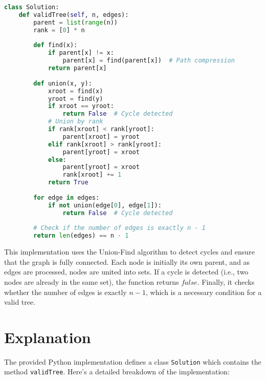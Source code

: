 \begin{fullwidth}
\begin{lstlisting}[language=Python]
class Solution:
    def validTree(self, n, edges):
        parent = list(range(n))
        rank = [0] * n
        
        def find(x):
            if parent[x] != x:
                parent[x] = find(parent[x])  # Path compression
            return parent[x]
        
        def union(x, y):
            xroot = find(x)
            yroot = find(y)
            if xroot == yroot:
                return False  # Cycle detected
            # Union by rank
            if rank[xroot] < rank[yroot]:
                parent[xroot] = yroot
            elif rank[xroot] > rank[yroot]:
                parent[yroot] = xroot
            else:
                parent[yroot] = xroot
                rank[xroot] += 1
            return True
        
        for edge in edges:
            if not union(edge[0], edge[1]):
                return False  # Cycle detected
        
        # Check if the number of edges is exactly n - 1
        return len(edges) == n - 1
\end{lstlisting}
\end{fullwidth}

This implementation uses the Union-Find algorithm to detect cycles and ensure that the graph is fully connected. Each node is initially its own parent, and as edges are processed, nodes are united into sets. If a cycle is detected (i.e., two nodes are already in the same set), the function returns \( false \). Finally, it checks whether the number of edges is exactly \( n - 1 \), which is a necessary condition for a valid tree.

\section*{Explanation}

The provided Python implementation defines a class \texttt{Solution} which contains the method \texttt{validTree}. Here's a detailed breakdown of the implementation:

